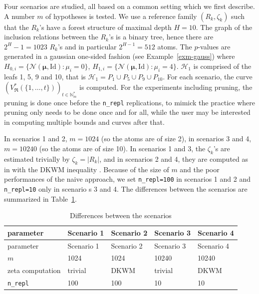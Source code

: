 \documentclass[
  11pt,
  a4paper,
]{article}
\theoremstyle{definition}
\theoremstyle{plain}
\theoremstyle{plain}
\theoremstyle{plain}
\theoremstyle{definition}
\theoremstyle{remark}
\begin{document}
Four scenarios are studied, all based on a common setting which we first
describe. A number \(m\) of hypotheses is tested. We use a reference
family \((R_k,\zeta_k)\) such that the \(R_k\)'s have a forest structure
of maximal depth \(H=10\). The graph of the inclusion relations between
the \(R_k\)'s is a binary tree, hence there are \(2^H-1=1023\) \(R_k\)'s
and in particular \(2^{H-1}=512\) atoms. The \(p\)-values are generated
in a gaussian one-sided fashion (see Example~\ref{exm-gauss}) where
\(H_{0,i}= \{ \mathcal N(\boldsymbol{\mu}, \mathrm{Id})  :\mu_i=0 \}\),
\(H_{1,i}=\{ \mathcal N(\boldsymbol{\mu}, \mathrm{Id}) :\mu_i=4 \}\).
\(\mathcal{H}_1\) is comprised of the leafs 1, 5, 9 and 10, that is
\(\mathcal{H}_1=P_1\cup P_5\cup P_9\cup P_{10}\). For each scenario, the
curve
\(\left(V^*_{\mathfrak{R}}(\{1,\dotsc,t \})\right)_{t\in\mathbb{N}_m^*}\)
is computed. For the experiments including pruning, the pruning is done
once before the \texttt{n\_repl} replications, to mimick the practice
where pruning only needs to be done once and for all, while the user may
be interested in computing multiple bounds and curves after that.

In scenarios 1 and 2, \(m=1024\) (so the atoms are of size 2), in
scenarios 3 and 4, \(m=10240\) (so the atoms are of size 10). In
scenarios 1 and 3, the \(\zeta_k\)'s are estimated trivially by
\(\zeta_k=|R_k|\), and in scenarios 2 and 4, they are computed as in
\citet{MR4178188} with the DKWM inequality \citetext{\citealp[
]{MR0083864}; \citealp{MR1062069}}. Because of the size of \(m\) and the
poor performances of the naive approach, we set \texttt{n\_repl=100} in
scenarios 1 and 2 and \texttt{n\_repl=10} only in scenario s 3 and 4.
The differences between the scenarios are summarized in
Table~\ref{tbl-scenarios}.

\begin{longtable}[]{@{}lllll@{}}
\caption{Differences between the
scenarios}\label{tbl-scenarios}\tabularnewline
\toprule\noalign{}
parameter & Scenario 1 & Scenario 2 & Scenario 3 & Scenario 4 \\
\midrule\noalign{}
\endfirsthead
\toprule\noalign{}
parameter & Scenario 1 & Scenario 2 & Scenario 3 & Scenario 4 \\
\midrule\noalign{}
\endhead
\bottomrule\noalign{}
\endlastfoot
\(m\) & 1024 & 1024 & 10240 & 10240 \\
zeta computation & trivial & DKWM & trivial & DKWM \\
\texttt{n\_repl} & 100 & 100 & 10 & 10 \\
\end{longtable}
\end{document}
